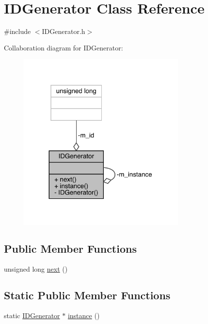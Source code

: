 \hypertarget{class_i_d_generator}{}\section{I\+D\+Generator Class Reference}
\label{class_i_d_generator}


{\ttfamily \#include $<$I\+D\+Generator.\+h$>$}



Collaboration diagram for I\+D\+Generator\+:
\nopagebreak
\begin{figure}[H]
\begin{center}
\leavevmode
\includegraphics[width=239pt]{class_i_d_generator__coll__graph}
\end{center}
\end{figure}
\subsection*{Public Member Functions}
\begin{DoxyCompactItemize}
\item 
unsigned long \mbox{\hyperlink{class_i_d_generator_a99d8cabb2ec6a17888a8ccbe9c85fee0}{next}} ()
\end{DoxyCompactItemize}
\subsection*{Static Public Member Functions}
\begin{DoxyCompactItemize}
\item 
static \mbox{\hyperlink{class_i_d_generator}{I\+D\+Generator}} $\ast$ \mbox{\hyperlink{class_i_d_generator_ad852c6dadc89e1020e4b3932f5a97bb3}{instance}} ()
\end{DoxyCompactItemize}
